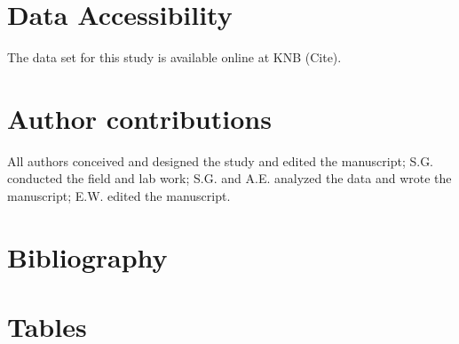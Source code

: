 \documentclass{article}
\begin{document}
\section*{Data Accessibility}
The data set for this study is available online at KNB (Cite). 

\section*{Author contributions} All authors conceived and designed the study and edited the manuscript; S.G. conducted the field and lab work; S.G. and A.E. analyzed the data and wrote the manuscript; E.W. edited the manuscript.

\section{Bibliography}


\section* {Tables}
\end{document}
